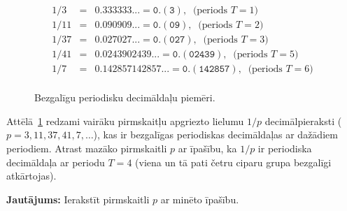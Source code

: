 \documentclass[a4paper,12pt]{article}
\newcommand\answer[1]{}
\begin{document}
\vspace{20pt}
\begin{figure}[!htb]
\[  \begin{array}{rcl}
1/3 & = & \mathtt{0.333333...} = \mathtt{0.(3)},\;\;\text{(periods $T=1$)}\\
1/11 & = & \mathtt{0.090909...} = \mathtt{0.(09)},\;\;\text{(periods $T=2$)}\\
1/37 & = & \mathtt{0.027027...} = \mathtt{0.(027)},\;\;\text{(periods $T=3$)}\\
1/41 & = & \mathtt{0.0243902439...} = \mathtt{0.(02439)},\;\;\text{(periods $T=5$)}\\
1/7 & = & \mathtt{0.142857142857...} = \mathtt{0.(142857)},\;\;\text{(periods $T=6$)}\\
\end{array} \]
\caption{\label{fig:division-samples} Bezgalīgu periodisku decimāldaļu piemēri.}
\end{figure}


\vspace{10pt}
\begin{problem}
Attēlā~\ref{fig:division-samples} redzami vairāku pirmskaitļu apgriezto lielumu $1/p$ decimālpieraksti 
($p = 3,11,37,41,7,\ldots$), kas ir bezgalīgas periodiskas decimāldaļas ar dažādiem 
periodiem. Atrast mazāko pirmskaitli $p$ ar īpašību, ka $1/p$ ir periodiska decimāldaļa
ar periodu $T=4$ (viena un tā pati četru ciparu grupa bezgalīgi atkārtojas).

{\bf Jautājums:} Ierakstīt pirmskaitli $p$ ar minēto īpašību.
\answer{

{\bf Atbilde:} $\mathtt{101}$\\
Dalīšanas rezultāts ir $0.00990099\ldots = 0.(0099)$. 

Ievērosim arī, ka $1/9999 = 0.00010001\ldots = 0.(0001)$. 
Tāpēc $p = 101$ ir vienīgais pirmskaitlis ar šādu periodu, jo 
tam jābūt skaitļa $9999$ dalītājam, lai daļu 
\[ \frac{a}{9999}=\frac{1}{101}. \]
varētu saīsināt vienalga kādam veselam skaitlim $a$. (Šajā gadījumā $a=0099 =99$.)

Bet $9999 = 3^3 \cdot 11 \cdot 101$. Tāpēc vienīgais pirmskaitlis ar šo periodu ir 
$101$, jo skaitļi $1/3$ un $1/11$ dod īsākus periodus. 
}
\end{problem}
\end{document}
